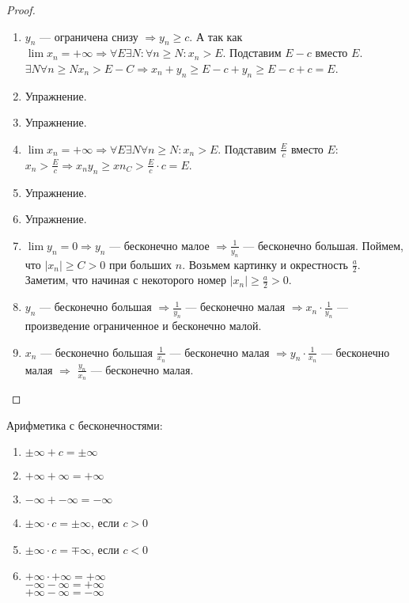 \begin{proof}
    \slashn
    \begin{enumerate}
        \item $y_n$ --- ограничена снизу  $\Rightarrow y_n \ge c$. А так как $\lim x_n = +\infty \Rightarrow \forall E \exists N: \forall n \ge N: x_n > E$. Подставим $E-c$ вместо  $E$.  $\exists N \forall n \ge N x_n > E - C \Rightarrow x_n + y_n \ge E - c + y_n \ge E - c + c= E$.
        \item Упражнение.
        \item Упражнение.
        \item $\lim x_n = +\infty \Rightarrow \forall E \exists N \forall n \ge N: x_n > E$. Подставим $\frac{E}{c}$ вместо $E$:  $x_n > \frac{E}{c} \Rightarrow x_ny_n \ge xn_C > \frac{E}{c}\cdot c = E$.
        \item Упражнение.
        \item Упражнение.
        \item $\lim y_n = 0 \Rightarrow y_n$ --- бесконечно малое $\Rightarrow \frac{1}{y_n}$ --- бесконечно большая. Поймем, что $|x_n| \ge C > 0$ при больших $n$. Возьмем картинку и окрестность  $\frac{a}{2}$. Заметим, что начиная с некоторого номер $|x_n| \ge \frac{a}{2} > 0$.
        \item $y_n $ --- бесконечно большая  $\Rightarrow \frac{1}{y_n}$ --- бесконечно малая $\Rightarrow x_n \cdot \frac{1}{y_n}$ --- произведение ограниченное и бесконечно малой.
        \item $x_n$ --- бесконечно большая  $\frac{1}{x_n}$ --- бесконечно малая $\Rightarrow y_n \cdot \frac{1}{x_n}$ --- бесконечно малая $\Rightarrow$  $\frac{y_n}{x_n}$ --- бесконечно малая.
    \end{enumerate}
\end{proof}
\slashn Арифметика с бесконечностями:
\begin{enumerate}
    \item $\pm \infty + c = \pm \infty$ 
    \item $+\infty + \infty = +\infty$
    \item  $-\infty + -\infty = -\infty$
    \item  $\pm \infty \cdot c = \pm \infty$, если  $c>0$
    \item  $\pm \infty \cdot c = \mp \infty$, если $c<0$
    \item  $+\infty\cdot+\infty = +\infty$\\
        $-\infty-\infty=+\infty$\\
        $+\infty-\infty = -\infty$
\end{enumerate}
